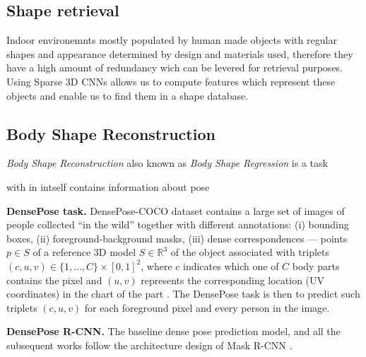 \subsection{Shape retrieval}

Indoor environemnts mostly populated by human made objects with regular shapes and appearance determined by design and materials used, therefore they have a high amount of redundancy wich can be levered for retrieval purposes. Using Sparse 3D CNNs allows us to compute features which represent these objects and enable us to find them in a shape database. 

\subsection{Body Shape Reconstruction}

\textit{Body Shape Reconstruction} also known as \textit{Body Shape Regression} is a task 
 
 with in intself contains information about pose


\noindent 
\textbf{DensePose task.} DensePose-COCO dataset contains a large set of images of people collected ``in the wild'' together with different annotations: (i) bounding boxes, (ii) foreground-background masks, (iii) dense correspondences --- points $p \in S$ of a reference 3D model $S\in\mathbb{R}^3$ of the object associated with triplets $(c, u, v) \in\{1, \ldots, C\} \times[0,1]^{2}$, where $c$ indicates which one of $C$ body parts contains the pixel and $(u,v)$ represents the corresponding location (UV coordinates) in the chart of the part \cite{smpl}.
The DensePose task is then to predict such triplets $(c, u, v)$ for each foreground pixel and every person in the image.
\newline

\noindent \textbf{DensePose R-CNN.} The baseline dense pose prediction model, and all the subsequent works \cite{parsing, uncertainty, monkeys} follow the architecture design of Mask R-CNN \cite{maskrcnn}.

